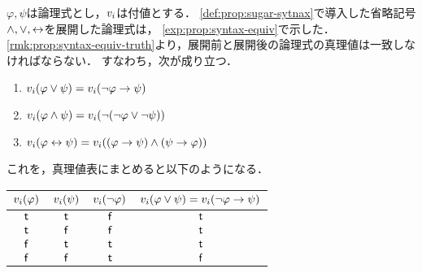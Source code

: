 \begin{myCorollary}
  \label{cor:prop:valuation-sugar-syntax}
  $\varphi, \psi$は論理式とし，$v_i$は付値とする．
  \ref{def:prop:sugar-sytnax}で導入した省略記号$\land, \lor, \leftrightarrow$を展開した論理式は，
  \ref{exp:prop:syntax-equiv}で示した．
  \ref*{rmk:prop:syntax-equiv-truth}より，展開前と展開後の論理式の真理値は一致しなければならない．
  すなわち，次が成り立つ．
  \begin{enumerate}
    \item $v_i(\varphi \lor \psi) = v_i(\lnot \varphi \to \psi)$
    \item $v_i(\varphi \land \psi) = v_i(\lnot(\lnot\varphi \lor \lnot\psi))$
    \item $v_i(\varphi \leftrightarrow \psi) = v_i((\varphi \to \psi) \land (\psi \to \varphi))$
  \end{enumerate}
  これを，真理値表にまとめると以下のようになる．
  \begin{table}
    \begin{tabular}{|c|c|c|c|}\hline
      $v_i(\varphi)$ & $v_i(\psi)$ & $v_i(\lnot\varphi)$ & $v_i(\varphi \lor \psi) = v_i(\lnot \varphi \to \psi)$ \\ \hline
      $\mathsf{t}$                                  & $\mathsf{t}$                               & $\mathsf{f}$                                      & $\mathsf{t}$                                                                                                      \\ \hline
      $\mathsf{t}$                                  & $\mathsf{f}$                              & $\mathsf{f}$                                      & $\mathsf{t}$                                                                                                      \\ \hline
      $\mathsf{f}$                                 & $\mathsf{t}$                               & $\mathsf{t}$                                       & $\mathsf{t}$                                                                                                      \\ \hline
      $\mathsf{f}$                                 & $\mathsf{f}$                              & $\mathsf{t}$                                       & $\mathsf{f}$                                                                                                     \\ \hline
    \end{tabular}
  \end{table}


\end{myCorollary}
